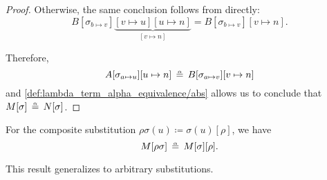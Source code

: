 \begin{proof}
  Otherwise, the same conclusion follows from  directly:
  \begin{equation*}
    B[\sigma_{b \mapsto v}]\underbrace{[v \mapsto u][u \mapsto n]}_{[v \mapsto n]} = B[\sigma_{b \mapsto v}][v \mapsto n].
  \end{equation*}

  Therefore,
  \begin{equation*}
    A[\sigma_{a \mapsto u}][u \mapsto n]
    \aequiv
    B[\sigma_{a \mapsto v}][v \mapsto n]
  \end{equation*}
  and \ref{def:lambda_term_alpha_equivalence/abs} allows us to conclude that \( M[\sigma] \aequiv N[\sigma] \).
\end{proof}

\begin{proposition}\label{thm:substitution_composition_is_alpha_equivalent}
  For the composite substitution \( \rho\sigma(u) \coloneqq \sigma(u)[\rho] \), we have
  \begin{equation}\label{eq:thm:substitution_composition_is_alpha_equivalent}
    M[\rho\sigma] \aequiv M[\sigma][\rho].
  \end{equation}
\end{proposition}
\begin{comments}
  \item This result generalizes  to arbitrary substitutions.
\end{comments}
